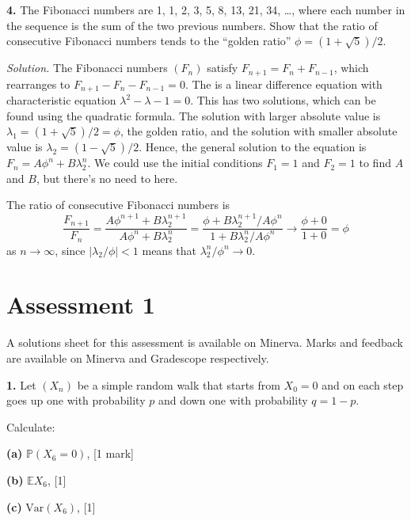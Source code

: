 \documentclass[
  a4paper,
]{article}
\theoremstyle{definition}
\theoremstyle{definition}
\theoremstyle{definition}
\theoremstyle{remark}
\begin{document}
\textbf{4.} The Fibonacci numbers are 1, 1, 2, 3, 5, 8, 13, 21, 34, \ldots, where each number in the sequence is the sum of the two previous numbers. Show that the ratio of consecutive Fibonacci numbers tends to the ``golden ratio'' \(\phi = (1 + \sqrt{5})/2\).

\begin{myanswers}

\emph{Solution.} The Fibonacci numbers \((F_n)\) satisfy \(F_{n+1} = F_n + F_{n-1}\), which rearranges to \(F_{n+1} -F_n - F_{n-1} = 0\). The is a linear difference equation with characteristic equation \(\lambda^2 - \lambda - 1 = 0\). This has two solutions, which can be found using the quadratic formula. The solution with larger absolute value is \(\lambda_1 = (1+\sqrt{5})/2 = \phi\), the golden ratio, and the solution with smaller absolute value is \(\lambda_2 = (1-\sqrt{5})/2\). Hence, the general solution to the equation is \(F_n = A\phi^n + B\lambda_2^n\). We could use the initial conditions \(F_1 = 1\) and \(F_2 = 1\) to find \(A\) and \(B\), but there's no need to here.

The ratio of consecutive Fibonacci numbers is
\[ \frac{F_{n+1}}{F_n} = \frac{A\phi^{n+1} + B\lambda_2^{n+1}}{A\phi^n + B\lambda_2^n} = \frac{\phi + B\lambda_2^{n+1}/A\phi^n}{1 + B\lambda_2^n/A\phi^n} \to \frac{\phi + 0}{1 + 0} = \phi \]
as \(n \to \infty\), since \(|\lambda_2/\phi| < 1\) means that \(\lambda_2^n / \phi^n \to 0\).

\end{myanswers}

\hypertarget{A1}{%
\section*{Assessment 1}\label{A1}}

A solutions sheet for this assessment is available on Minerva. Marks and feedback are available on Minerva and Gradescope respectively.

\textbf{1.} Let \((X_n)\) be a simple random walk that starts from \(X_0 = 0\) and on each step goes up one with probability \(p\) and down one with probability \(q = 1-p\).

Calculate:

\textbf{(a)} \(\mathbb P(X_6 = 0)\), {{[}1 mark{]}}

\textbf{(b)} \(\mathbb EX_6\), {{[}1{]}}

\textbf{(c)} \(\text{Var}(X_6)\), {{[}1{]}}
\end{document}
